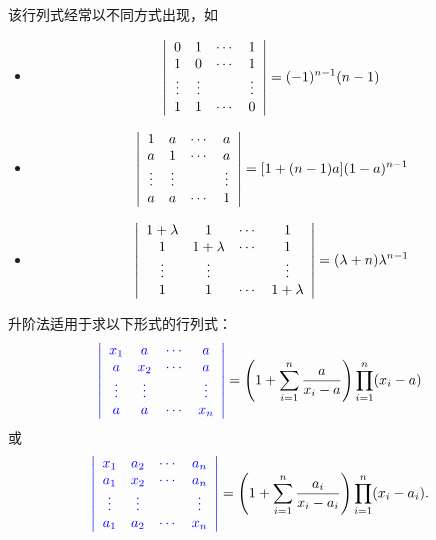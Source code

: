 \begin{frame}
 
  该行列式经常以不同方式出现，如
  \begin{itemize}
  \item
    $$
    \left|
      \begin{array}{cccc}
        0  &  1  & \cdots & 1   \\
        1  &  0  & \cdots & 1   \\
        \vdots& \vdots &     & \vdots \\
        1  &  1  & \cdots & 0 
      \end{array}
    \right|   = (-1)^{n-1}(n-1)
    $$ 
  \item
    $$
    \left|
      \begin{array}{cccc}
        1  &  a  & \cdots & a   \\
        a  &  1  & \cdots & a   \\
        \vdots& \vdots &     & \vdots \\
        a  &  a  & \cdots & 1
      \end{array}
    \right| 
    = [1+(n-1)a](1-a)^{n-1}
    $$ 
  \item
    $$
    \left|
      \begin{array}{cccc}
        1+\lambda  &  1  & \cdots & 1   \\
        1  &  1+\lambda  & \cdots & 1   \\
        \vdots& \vdots &     & \vdots \\
        1  &  1  & \cdots & 1+\lambda 
      \end{array}
    \right| 
    = (\lambda+n)\lambda^{n-1}
    $$
  \end{itemize}
\end{frame}

\begin{frame}

  升阶法适用于求以下形式的行列式：
  $$
  \textcolor{blue}{\left|
    \begin{array}{cccc}
      x_1 &  a  & \cdots & a   \\
      a   & x_2 & \cdots & a   \\
      \vdots & \vdots &     & \vdots \\
      a   &  a  & \cdots & x_n
    \end{array}
  \right|}=   \left(1+\sum_{i=1}^n \frac{a}{x_i-a}\right)\prod_{i=1}^n(x_i-a)
  $$
  或
  $$
  \textcolor{blue}{\left|
    \begin{array}{cccc}
      x_1 & a_2  & \cdots & a_n   \\
      a_1 & x_2 & \cdots  & a_n   \\
      \vdots & \vdots &     & \vdots \\
      a_1 & a_2  & \cdots & x_n
    \end{array}
  \right|}=  \left(1+\sum_{i=1}^n \frac{a_i}{x_i-a_i}\right)\prod_{i=1}^n(x_i-a_i).
  $$      
 
\end{frame}

